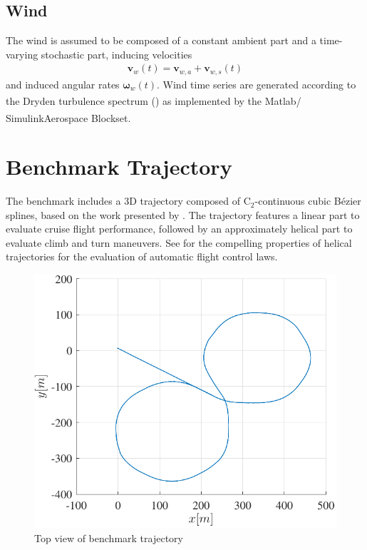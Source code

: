 \documentclass{ifacconf}
\newcommand{\Matlabbrand}{Matlab\textsuperscript{\tiny{\textregistered}}}
\newcommand{\Simulinkbrand}{Simulink\textsuperscript{\tiny{\textregistered}}}
\begin{document}
\subsection{Wind}
The wind is assumed to be composed of a constant ambient part and a time-varying stochastic part, inducing velocities
\begin{align}
\mathbf{v}_w(t) = \mathbf{v}_{w,a} + \mathbf{v}_{w,s}(t)
\end{align}
and induced angular rates
$\mathbf{\omega}_w(t)$. 
Wind time series are generated according to the Dryden turbulence spectrum (\cite{standardflying}) as implemented by the \Matlabbrand / \Simulinkbrand Aerospace Blockset\textsuperscript{\texttrademark}.
\section{Benchmark Trajectory}
\label{sec:trajectory}
The benchmark includes a 3D trajectory composed of $\mathrm{C}_2$-continuous cubic Bézier splines, based on the work presented by \cite{Yang2008}. The trajectory features a linear part to evaluate cruise flight performance, followed by an approximately helical part to evaluate climb and turn maneuvers. See \cite{looye2011helical} for the compelling properties of helical trajectories for the evaluation of automatic flight control laws.
%
\begin{figure}
\centering
\includegraphics[width=.6\columnwidth]{trajectory.pdf}
\caption{Top view of benchmark trajectory}
\end{figure}
%
%
\end{document}

